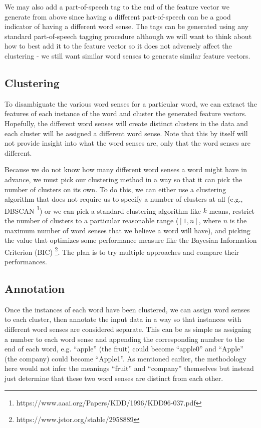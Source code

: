 \documentclass[11pt,letterpaper]{article}
\begin{document}
We may also add a part-of-speech tag to the end of the feature vector we generate from above since having a different part-of-speech can be a good indicator of having a different word sense. The tags can be generated using any standard part-of-speech tagging procedure although we will want to think about how to best add it to the feature vector so it does not adversely affect the clustering - we still want similar word senses to generate similar feature vectors.

\subsection{Clustering}
To disambiguate the various word senses for a particular word, we can extract the features of each instance of the word and cluster the generated feature vectors. Hopefully, the different word senses will create distinct clusters in the data and each cluster will be assigned a different word sense. Note that this by itself will not provide insight into what the word senses are, only that the word senses are different. 

Because we do not know how many different word senses a word might have in advance, we must pick our clustering method in a way so that it can pick the number of clusters on its own. To do this, we can either use a clustering algorithm that does not require us to specify a number of clusters at all (e.g., DBSCAN \footnote{https://www.aaai.org/Papers/KDD/1996/KDD96-037.pdf}) or we can pick a standard clustering algorithm like $k$-means, restrict the number of clusters to a particular reasonable range ($[1,n]$, where $n$ is the maximum number of word senses that we believe a word will have), and picking the value that optimizes some performance measure like the Bayesian Information Criterion (BIC) \footnote{https://www.jstor.org/stable/2958889}. The plan is to try multiple approaches and compare their performances.

\subsection{Annotation}
Once the instances of each word have been clustered, we can assign word senses to each cluster, then annotate the input data in a way so that instances with different word senses are considered separate. This can be as simple as assigning a number to each word sense and appending the corresponding number to the end of each word, e.g. ``apple'' (the fruit) could become ``apple0'' and ``Apple'' (the company) could become ``Apple1''. As mentioned earlier, the methodology here would not infer the meanings ``fruit'' and ``company'' themselves but instead just determine that these two word senses are distinct from each other.
\end{document}
